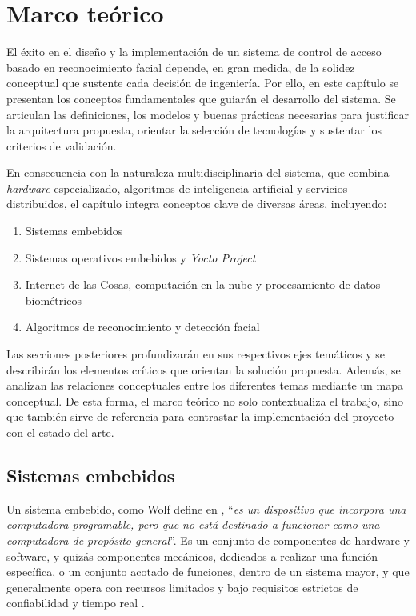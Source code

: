 \chapter{Marco teórico}
\label{ch:marco}

El éxito en el diseño y la implementación de un sistema de control de acceso basado en reconocimiento facial depende, en gran medida, de la solidez conceptual que sustente cada decisión de ingeniería. Por ello, en este capítulo se presentan los conceptos fundamentales que guiarán el desarrollo del sistema. Se articulan las definiciones, los modelos y buenas prácticas necesarias para justificar la arquitectura propuesta, orientar la selección de tecnologías y sustentar los criterios de validación.

En consecuencia con la naturaleza multidisciplinaria del sistema, que combina \textit{hardware} especializado, algoritmos de inteligencia artificial y servicios distribuidos, el capítulo integra conceptos clave de diversas áreas, incluyendo:

\begin{enumerate}
    \item Sistemas embebidos
    \item Sistemas operativos embebidos y \textit{Yocto Project}
    \item Internet de las Cosas, computación en la nube y procesamiento de datos biométricos
    \item Algoritmos de reconocimiento y detección facial
\end{enumerate}

Las secciones posteriores profundizarán en sus respectivos ejes temáticos y se describirán los elementos críticos que orientan la solución propuesta. Además, se analizan las relaciones conceptuales entre los diferentes temas mediante un mapa conceptual. De esta forma, el marco teórico no solo contextualiza el trabajo, sino que también sirve de referencia para contrastar la implementación del proyecto con el estado del arte.

\section{Sistemas embebidos}
Un sistema embebido, como Wolf define en \cite{wolf_embedded_2012}, ``\textit{es un dispositivo que incorpora una computadora programable, pero que no está destinado a funcionar como una computadora de propósito general}''. Es un conjunto de componentes de hardware y software, y quizás componentes mecánicos, dedicados a realizar una función específica, o un conjunto acotado de funciones, dentro de un sistema mayor, y que generalmente opera con recursos limitados y bajo requisitos estrictos de confiabilidad y tiempo real \cite{barr_embedded_1999}.

